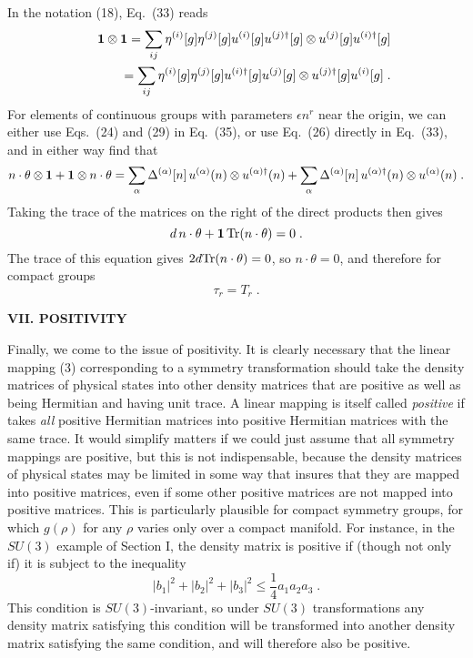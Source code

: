 In the notation (18), Eq.~(33)  reads
\begin{eqnarray}
&&{\mbox{\boldmath{$1$}}}\otimes {\mbox{\boldmath{$1$}}}=\sum_{ij}\eta^{(i)}[g]\eta^{(j)}[g]u^{(i)}[g]u^{(j)\dagger}[g]\otimes u^{(j)}[g]u^{(i)\dagger}[g]\nonumber\\&&~~~~~~~
=\sum_{ij}\eta^{(i)}[g]\eta^{(j)}[g]u^{(i)\dagger}[g]u^{(j)}[g]\otimes u^{(j)\dagger}[g]u^{(i)}[g]\;.
\end{eqnarray}
For elements of continuous groups with parameters $\epsilon n^r$ near the origin, we can either use Eqs.~(24) and (29) in Eq.~(35), or use Eq.~(26) directly in Eq.~(33), and in either way find that 
\begin{equation}
n\cdot \theta\otimes {\mbox{\boldmath{$1$}}}+{\mbox{\boldmath{$1$}}}\otimes n\cdot \theta=\sum_\alpha \Delta^{(\alpha)}[n]\,u^{(\alpha)}(n)\otimes u^{(\alpha)\dagger}(n)
+\sum_\alpha \Delta^{(\alpha)}[n]\,u^{(\alpha)\dagger}(n)\otimes u^{(\alpha)}(n)\;.
\end{equation}
Taking the trace of the matrices on the right of the direct products then gives
$$
d\,n\cdot \theta+{\mbox{\boldmath{$1$}}}\,{\rm Tr}(n\cdot \theta)=0\;.
$$
The trace of this equation gives $2d{\rm Tr}(n\cdot \theta)=0$, so $n\cdot \theta=0$, and therefore for compact groups 
\begin{equation}
\tau_r=T_r\;.
\end{equation}


\begin{center}
{\bf VII. POSITIVITY}
\end{center}

Finally, we come to the  issue of positivity.  It is clearly necessary that the linear mapping (3) corresponding to a symmetry transformation should take the density matrices of physical states into other density matrices that are positive as well as being Hermitian and having unit trace.  A linear mapping is itself called {\em positive} if takes {\em all} positive Hermitian matrices into positive Hermitian matrices with the same trace.  It would simplify matters if we could just assume that all symmetry mappings are positive, but this is not indispensable, because the density matrices of physical states may be limited in some way that insures that they are mapped into positive matrices, even if some other positive matrices are not mapped into positive matrices.  This is particularly plausible for compact symmetry groups, for which $g(\rho)$ for any $\rho$ varies only over a compact manifold.   For instance, in the $SU(3)$ example of Section I, the density matrix is positive if
(though not only if) it is subject to the inequality
$$ |b_1|^2+|b_2|^2+|b_3|^2\leq \frac{1}{4}a_1 a_2 a_3\;.$$
This condition is $SU(3)$-invariant, so under $SU(3)$ transformations any density matrix satisfying  this condition will be transformed into another density matrix satisfying the same condition, and will therefore  also be positive.

